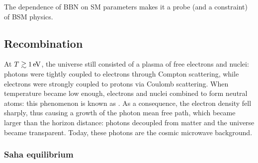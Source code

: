 The dependence of BBN on SM parameters makes it a probe (and a constraint) of BSM physics.

\subsection{Recombination}
\label{ssec:recombination}

At $ T \gtrsim 1 \,\mathrm{eV} $, the universe still consisted of a plasma of free electrons and nuclei: photons were tightly coupled to electrons through Compton scattering, while electrons were strongly coupled to protons via Coulomb scattering. When temperature became low enough, electrons and nuclei combined to form neutral atoms: this phenomenon is known as . As a consequence, the electron density fell sharply, thus causing a growth of the photon mean free path, which became larger than the horizon distance: photons decoupled from matter and the universe became transparent. Today, these photons are the cosmic microwave background.

\subsubsection{Saha equilibrium}

